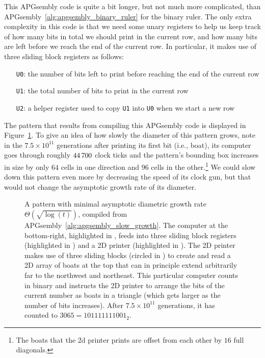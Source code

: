 This APGsembly code is quite a bit longer, but not much more complicated, than APGsembly~\ref{alg:apgsembly_binary_ruler} for the binary ruler. The only extra complexity in this code is that we need some unary registers to help us keep track of how many bits in total we should print in the current row, and how many bits are left before we reach the end of the current row. In particular, it makes use of three sliding block registers as follows:\smallskip

\begin{itemize}
	\item[\texttt{U0}:] the number of bits left to print before reaching the end of the current row
	
	\item[\texttt{U1}:] the total number of bits to print in the current row
	
	\item[\texttt{U2}:] a helper register used to copy \texttt{U1} into \texttt{U0} when we start a new row\smallskip
\end{itemize}

The pattern that results from compiling this APGsembly code is displayed in Figure~\ref{fig:osqrtlogt}. To give an idea of how slowly the diameter of this pattern grows, note in the $7.5 \times 10^{11}$ generations after printing its first bit (i.e., boat), its computer goes through roughly $44{\,}700$ clock ticks and the pattern's bounding box increases in size by only $64$ cells in one direction and $96$ cells in the other.\footnote{The boats that the 2d printer prints are offset from each other by $16$ full diagonals.} We could slow down this pattern even more by decreasing the speed of its clock gun, but that would not change the asymptotic growth rate of its diameter.

\begin{figure}[!htb]
	\centering
	\caption{A pattern with minimal asymptotic diametric growth rate $\Theta(\sqrt{\log(t)})$, compiled from APGsembly~\ref{alg:apgsembly_slow_growth}. The computer at the bottom-right, highlighted in , feeds into three sliding block registers (highlighted in ) and a 2D printer (highlighted in ). The 2D printer makes use of three sliding blocks (circled in ) to create and read a 2D array of boats at the top that can in principle extend arbitrarily far to the northwest and northeast. This particular computer counts in binary and instructs the 2D printer to arrange the bits of the current number as boats in a triangle (which gets larger as the number of bits increases). After $7.5 \times 10^{11}$ generations, it has counted to $3065 = 101111111001_2$.}\label{fig:osqrtlogt}
\end{figure}


